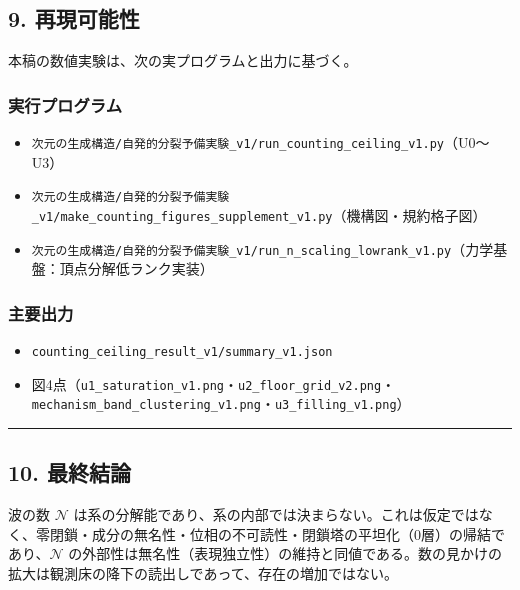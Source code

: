 \documentclass[
  a4paper,
]{ltjsarticle}
\providecommand{\tightlist}{%
  \setlength{\itemsep}{0pt}\setlength{\parskip}{0pt}}
\begin{document}
\subsection{9. 再現可能性}\label{ux518dux73feux53efux80fdux6027}

本稿の数値実験は、次の実プログラムと出力に基づく。

\subsubsection{実行プログラム}\label{ux5b9fux884cux30d7ux30edux30b0ux30e9ux30e0}

\begin{itemize}
\tightlist
\item
  \texttt{次元の生成構造/自発的分裂予備実験\_v1/run\_counting\_ceiling\_v1.py}（U0〜U3）
\item
  \texttt{次元の生成構造/自発的分裂予備実験\_v1/make\_counting\_figures\_supplement\_v1.py}（機構図・規約格子図）
\item
  \texttt{次元の生成構造/自発的分裂予備実験\_v1/run\_n\_scaling\_lowrank\_v1.py}（力学基盤：頂点分解低ランク実装）
\end{itemize}

\subsubsection{主要出力}\label{ux4e3bux8981ux51faux529b}

\begin{itemize}
\tightlist
\item
  \texttt{counting\_ceiling\_result\_v1/summary\_v1.json}
\item
  図4点（\texttt{u1\_saturation\_v1.png}・\texttt{u2\_floor\_grid\_v2.png}・\texttt{mechanism\_band\_clustering\_v1.png}・\texttt{u3\_filling\_v1.png}）
\end{itemize}

\begin{center}\rule{0.5\linewidth}{0.5pt}\end{center}

\subsection{10. 最終結論}\label{ux6700ux7d42ux7d50ux8ad6}

波の数 \(\mathcal N\)
は系の分解能であり、系の内部では決まらない。これは仮定ではなく、零閉鎖・成分の無名性・位相の不可読性・閉鎖塔の平坦化（0層）の帰結であり、\(\mathcal N\)
の外部性は無名性（表現独立性）の維持と同値である。数の見かけの拡大は観測床の降下の読出しであって、存在の増加ではない。
\end{document}
